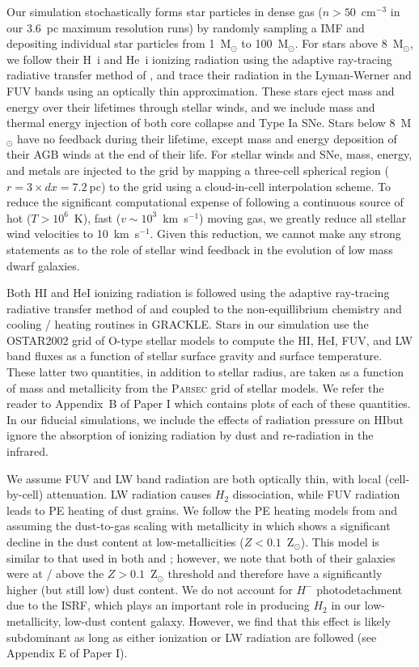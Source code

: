 \documentclass[twocolumn]{aastex62}
\newcommand{\HI}{HI}
\begin{document}
Our simulation stochastically forms star particles in dense gas ($n > 50$~cm$^{-3}$ in our 3.6~pc maximum resolution runs) by randomly sampling a \cite{Salpeter1955} IMF and depositing individual star particles from 1~M$_{\odot}$ to 100~M$_{\odot}$. For stars above 8~M$_{\odot}$, we follow their H~{\sc i} and He~{\sc i} ionizing radiation using the adaptive ray-tracing radiative transfer method of \cite{WiseAbel2011}, and trace their radiation in the Lyman-Werner and FUV bands using an optically thin approximation. These stars eject mass and energy over their lifetimes through stellar winds, and we include mass and thermal energy injection of both core collapse and Type Ia SNe. Stars below 8~M$_{\odot}$ have no feedback during their lifetime, except mass and energy deposition of their AGB winds at the end of their life. For stellar winds and SNe, mass, energy, and metals are injected to the grid by mapping a three-cell spherical region ($r=3 \times dx = 7.2~$pc) to the grid using a cloud-in-cell interpolation scheme. To reduce the significant computational expense of following a continuous source of hot ($T > 10^6$~K), fast ($v \sim 10^{3}$~km~s$^{-1}$) moving gas, we greatly reduce all stellar wind velocities to 10~km~s$^{-1}$. Given this reduction, we cannot make any strong statements as to the role of stellar wind feedback in the evolution of low mass dwarf galaxies. 

Both HI and HeI ionizing radiation is followed using the adaptive ray-tracing radiative transfer method of \cite{WiseAbel2011} and coupled to the non-equillibrium chemistry and cooling / heating routines in \textsc{GRACKLE}. Stars in our simulation use the \textsc{OSTAR2002} \citep{Lanz2003} grid of O-type stellar models to compute the HI, HeI, FUV, and LW band fluxes as a function of stellar surface gravity and surface temperature. These latter two quantities, in addition to stellar radius, are taken as a function of mass and metallicity from the \textsc{Parsec} \citep{Bressan2012,Tang2014} grid of stellar models. We refer the reader to Appendix~B of Paper I which contains plots of each of these quantities. In our fiducial simulations, we include the effects of radiation pressure on \HI but ignore the absorption of ionizing radiation by dust and re-radiation in the infrared.

We assume FUV and LW band radiation are both optically thin, with local (cell-by-cell) attenuation. LW radiation causes $H_2$ dissociation, while FUV radiation leads to PE heating of dust grains. We follow the PE heating models from \cite{Wolfire2003} and assuming the dust-to-gas scaling with metallicity in \cite{Remy-Ruyer2014} which shows a significant decline in the dust content at low-metallicities ($Z < 0.1$~Z$_{\odot}$). This model is similar to that used in both \cite{Forbes2016} and \cite{Hu2017}; however, we note that both of their galaxies were at / above the $Z > 0.1$~Z$_{\odot}$ threshold and therefore have a significantly higher (but still low) dust content. We do not account for $H^-$ photodetachment due to the ISRF, which plays an important role in producing $H_2$ in our low-metallicity, low-dust content galaxy. However, we find that this effect is likely subdominant as long as either ionization or LW radiation are followed (see Appendix E of Paper I).
\end{document}

